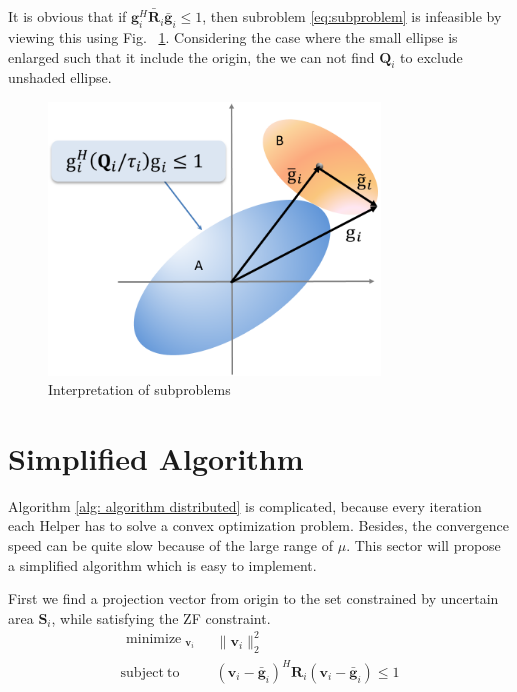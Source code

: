 \documentclass[conference]{IEEEtran}
\begin{document}
It is obvious that if $\bar{\mathbf{g}_i^H\mathbf{R}_i\bar{\mathbf{g}}_i} \leq 1$, then subroblem \eqref{eq:subproblem} is infeasible by viewing this using Fig. ~\ref{fig:interpretation of subproblems}. Considering the case where the small ellipse is enlarged such that it include the origin, the we can not find $\mathbf{Q}_i$ to exclude unshaded ellipse.


\begin{figure}[ht]
	\centering
	\includegraphics[width=8.8cm]{subproblem.png} %
	\caption{Interpretation of subproblems}
	\label{fig:interpretation of subproblems}
\end{figure}

\section{Simplified Algorithm} \label{sec:simplified algorithm}
Algorithm \ref{alg: algorithm distributed} is complicated, because every iteration each Helper has to solve a convex optimization problem. Besides, the convergence speed can be quite slow  because of the large range of $\mu$. This sector will propose a simplified algorithm which is easy to implement. 

First we find a projection vector from origin to the set constrained by uncertain area $\mathbf{S}_i$, while satisfying the ZF constraint.
\begin{equation}\label{eq:projection}
\begin{array}{ll}
\begin{split}
\mathop{\text{minimize}}_{\substack{\mathbf{v}_{i}}} 
\end{split}  
& \|\mathbf{v}_i\|_2^2\\
\mathrm{subject~to}
& (\mathbf{v}_i-\bar{\mathbf{g}}_i)^H\mathbf{R}_i(\mathbf{v}_i-\bar{\mathbf{g}}_i) \leq 1
\end{array}
\end{equation}
\end{document}
